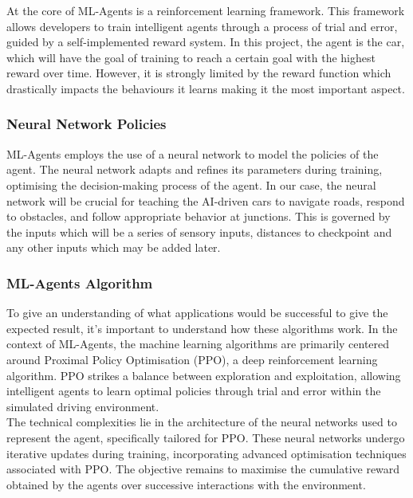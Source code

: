 \documentclass{article}
\begin{document}
At the core of ML-Agents is a reinforcement learning framework. This framework allows developers to train intelligent agents through a process of trial and error, guided by a self-implemented reward system. In this project, the agent is the car, which will have the goal of training to reach a certain goal with the highest reward over time. However, it is strongly limited by the reward function which drastically impacts the behaviours it learns making it the most important aspect.

\subsubsection{Neural Network Policies}
ML-Agents employs the use of a neural network to model the policies of the agent. The neural network adapts and refines its parameters during training, optimising the decision-making process of the agent. In our case, the neural network will be crucial for teaching the AI-driven cars to navigate roads, respond to obstacles, and follow appropriate behavior at junctions. This is governed by the inputs which will be a series of sensory inputs, distances to checkpoint and any other inputs which may be added later.

\subsubsection{ML-Agents Algorithm}
To give an understanding of what applications would be successful to give the expected result, it's important to understand how these algorithms work. In the context of ML-Agents, the machine learning algorithms are primarily centered around Proximal Policy Optimisation (PPO), a deep reinforcement learning algorithm. PPO strikes a balance between exploration and exploitation, allowing intelligent agents to learn optimal policies through trial and error within the simulated driving environment.\cite{PPO-MLAgents}\\

 The technical complexities lie in the architecture of the neural networks used to represent the agent, specifically tailored for PPO. These neural networks undergo iterative updates during training, incorporating advanced optimisation techniques associated with PPO. The objective remains to maximise the cumulative reward obtained by the agents over successive interactions with the environment.\\
\end{document}
